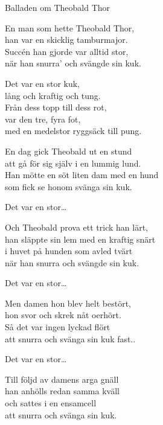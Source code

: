 \begin{song}{Balladen om Theobald Thor}


    \showversenumber	
	En man som hette Theobald Thor,\\
	han var en skicklig tamburmajor.\\
	Succén han gjorde var alltid stor,\\
	när han snurra' och svängde sin kuk.
	
	\vspace{-.1cm}
	Det var en stor kuk,\\
	lång och kraftig och tung.\\
	Från dess topp till dess rot,\\
	var den tre, fyra fot,\\
	med en medelstor ryggsäck till pung.
	
    \showversenumber
	En dag gick Theobald ut en stund\\
	att gå för sig själv i en lummig lund.\\
	Han mötte en söt liten dam med en hund\\
	som fick se honom svänga sin kuk.
	
	\vspace{-.1cm}
	Det var en stor\ldots{}
	
    \showversenumber
	Och Theobald prova ett trick han lärt,\\
	han släppte sin lem med en kraftig snärt\\
	i huvet på hunden som avled tvärt\\
	när han snurra och svängde sin kuk.
	
	\vspace{-.1cm}
	Det var en stor\ldots{}
	
    \showversenumber
	Men damen hon blev helt bestört,\\
	hon svor och skrek nåt oerhört.\\
	Så det var ingen lyckad flört\\
	att snurra och svänga sin kuk fast..
	
	\vspace{-.1cm}
	Det var en stor\ldots{}
	
    \showversenumber
	Till följd av damens arga gnäll\\
	han anhölls redan samma kväll\\
	och sattes i en ensamcell\\
	att snurra och svänga sin kuk.
	

\end{song}
